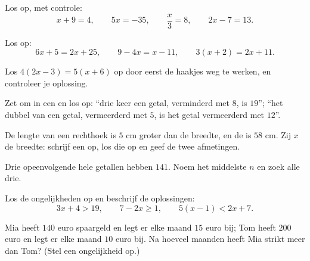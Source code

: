 \begin{exercise}[$\star$]\label{exo:g8:equations:4}
Los op, met controle:
\[
x + 9 = 4, \qquad
5x = -35, \qquad
\frac{x}{3} = 8, \qquad
2x - 7 = 13 .
\]
\end{exercise}

\begin{exercise}[$\star$]\label{exo:g8:equations:5}
Los op:
\[
6x + 5 = 2x + 25, \qquad
9 - 4x = x - 11, \qquad
3(x + 2) = 2x + 11 .
\]
\end{exercise}

\begin{exercise}[$\star$]\label{exo:g8:equations:6}
Los $4(2x - 3) = 5(x + 6)$ op door eerst de haakjes weg te werken, en
controleer je oplossing.
\end{exercise}

\begin{exercise}[$\star$]\label{exo:g8:equations:7}
Zet om in een  en los op: ``drie keer een getal, verminderd met
$8$, is $19$''; ``het dubbel van een getal, vermeerderd met $5$, is het getal
vermeerderd met $12$''.
\end{exercise}

\begin{exercise}[$\star\star$]\label{exo:g8:equations:8}
De lengte van een rechthoek is $5$ cm groter dan de breedte, en de  is
$58$ cm. Zij $x$ de breedte: schrijf een  op, los die op en geef de
twee afmetingen.
\end{exercise}

\begin{exercise}[$\star\star$]\label{exo:g8:equations:9}
Drie opeenvolgende hele getallen hebben  $141$. Noem het middelste $n$ en
zoek alle drie.
\end{exercise}

\begin{exercise}[$\star\star$]\label{exo:g8:equations:10}
Los de ongelijkheden op en beschrijf de oplossingen:
\[
3x + 4 > 19, \qquad
7 - 2x \geq 1, \qquad
5(x - 1) < 2x + 7 .
\]
\end{exercise}

\begin{exercise}[$\star\star$]\label{exo:g8:equations:11}
Mia heeft $140$ euro spaargeld en legt er elke maand $15$ euro bij; Tom heeft
$200$ euro en legt er elke maand $10$ euro bij. Na hoeveel maanden heeft Mia
strikt meer dan Tom? (Stel een ongelijkheid op.)
\end{exercise}

